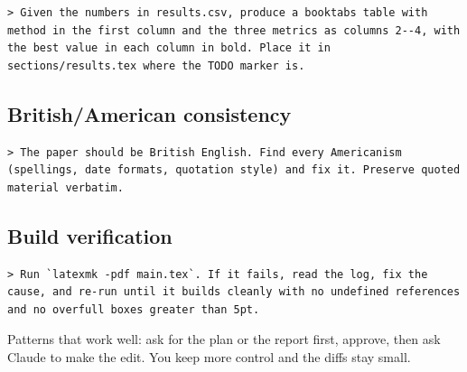\begin{lstlisting}[style=prompt]
> Given the numbers in results.csv, produce a booktabs table with method in the first column and the three metrics as columns 2--4, with the best value in each column in bold. Place it in sections/results.tex where the TODO marker is.
\end{lstlisting}

\subsection{British/American consistency}

\begin{lstlisting}[style=prompt]
> The paper should be British English. Find every Americanism (spellings, date formats, quotation style) and fix it. Preserve quoted material verbatim.
\end{lstlisting}

\subsection{Build verification}

\begin{lstlisting}[style=prompt]
> Run `latexmk -pdf main.tex`. If it fails, read the log, fix the cause, and re-run until it builds cleanly with no undefined references and no overfull boxes greater than 5pt.
\end{lstlisting}

\begin{tipbox}
Patterns that work well: ask for the plan or the report first, approve, then ask Claude to make the edit. You keep more control and the diffs stay small.
\end{tipbox}
